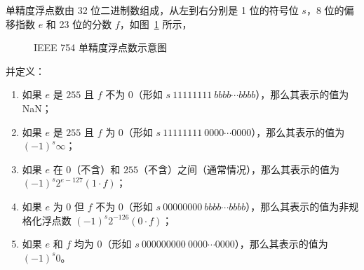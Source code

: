             单精度浮点数由 32 位二进制数组成，从左到右分别是 1 位的符号位 $s$，8 位的偏移指数 $e$ 和 23 位的分数 $f$，如图~\ref{fig:NumberSystemBasics/fixed-point-and-floating-point/ieee-754/basic-format/single} 所示，
            \begin{figure}
                \centering
                \caption{IEEE 754 单精度浮点数示意图}
                \label{fig:NumberSystemBasics/fixed-point-and-floating-point/ieee-754/basic-format/single}
            \end{figure}

            并定义：
            \begin{enumerate}
                \item 如果 $e$ 是 $255$ 且 $f$ 不为 $0$（形如 $s\ 11111111\ bbbb \cdots bbbb$），那么其表示的值为 NaN；
                \item 如果 $e$ 是 $255$ 且 $f$ 为 $0$（形如 $s\ 11111111\ 0000 \cdots 0000$），那么其表示的值为 $(-1)^s\infty$；
                \item 如果 $e$ 在 $0$（不含）和 $255$（不含）之间（通常情况），那么其表示的值为 $(-1)^s2^{e-127}(1 \cdot f)$；
                \item 如果 $e$ 为 $0$ 但 $f$ 不为 $0$（形如 $s\ 00000000\ bbbb \cdots bbbb$），那么其表示的值为非规格化浮点数 $(-1)^s2^{-126}(0 \cdot f)$；
                \item 如果 $e$ 和 $f$ 均为 $0$（形如 $s\ 000000000\ 0000 \cdots 0000$），那么其表示的值为 $(-1)^s0$。
            \end{enumerate}

